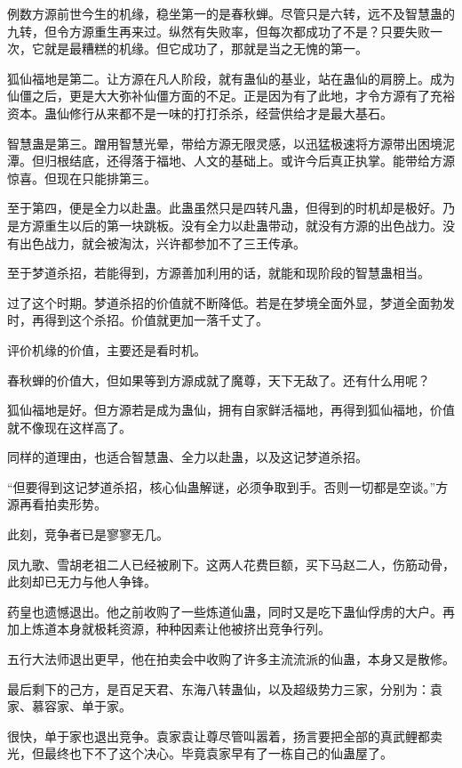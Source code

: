 \begin{this_body}
例数方源前世今生的机缘，稳坐第一的是春秋蝉。尽管只是六转，远不及智慧蛊的九转，但令方源重生再来过。纵然有失败率，但每次都成功了不是？只要失败一次，它就是最糟糕的机缘。但它成功了，那就是当之无愧的第一。

狐仙福地是第二。让方源在凡人阶段，就有蛊仙的基业，站在蛊仙的肩膀上。成为仙僵之后，更是大大弥补仙僵方面的不足。正是因为有了此地，才令方源有了充裕资本。蛊仙修行从来都不是一味的打打杀杀，经营供给才是最大基石。

智慧蛊是第三。蹭用智慧光晕，带给方源无限灵感，以迅猛极速将方源带出困境泥潭。但归根结底，还得落于福地、人文的基础上。或许今后真正执掌。能带给方源惊喜。但现在只能排第三。

至于第四，便是全力以赴蛊。此蛊虽然只是四转凡蛊，但得到的时机却是极好。乃是方源重生以后的第一块跳板。没有全力以赴蛊带动，就没有方源的出色战力。没有出色战力，就会被淘汰，兴许都参加不了三王传承。

至于梦道杀招，若能得到，方源善加利用的话，就能和现阶段的智慧蛊相当。

过了这个时期。梦道杀招的价值就不断降低。若是在梦境全面外显，梦道全面勃发时，再得到这个杀招。价值就更加一落千丈了。

评价机缘的价值，主要还是看时机。

春秋蝉的价值大，但如果等到方源成就了魔尊，天下无敌了。还有什么用呢？

狐仙福地是好。但方源若是成为蛊仙，拥有自家鲜活福地，再得到狐仙福地，价值就不像现在这样高了。

同样的道理由，也适合智慧蛊、全力以赴蛊，以及这记梦道杀招。

“但要得到这记梦道杀招，核心仙蛊解谜，必须争取到手。否则一切都是空谈。”方源再看拍卖形势。

此刻，竞争者已是寥寥无几。

凤九歌、雪胡老祖二人已经被刷下。这两人花费巨额，买下马赵二人，伤筋动骨，此刻却已无力与他人争锋。

药皇也遗憾退出。他之前收购了一些炼道仙蛊，同时又是吃下蛊仙俘虏的大户。再加上炼道本身就极耗资源，种种因素让他被挤出竞争行列。

五行大法师退出更早，他在拍卖会中收购了许多主流流派的仙蛊，本身又是散修。

最后剩下的己方，是百足天君、东海八转蛊仙，以及超级势力三家，分别为：袁家、慕容家、单于家。

很快，单于家也退出竞争。袁家袁让尊尽管叫嚣着，扬言要把全部的真武鲤都卖光，但最终也下不了这个决心。毕竟袁家早有了一栋自己的仙蛊屋了。


\end{this_body}
